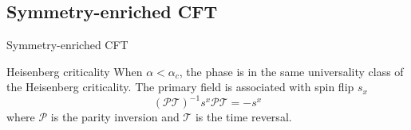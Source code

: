 \subsection{Symmetry-enriched CFT}
\begin{frame}{Symmetry-enriched CFT}

\begin{block}{Heisenberg criticality}
    When $\alpha < \alpha_c$, the phase is in the same universality class of the Heisenberg criticality.
    The primary field is associated with spin flip $s_x$
    \begin{equation*}
    (\mathcal{PT})^{-1} s^x \mathcal{PT} = -s^x
    \end{equation*}
    where $\mathcal{P}$ is the parity inversion and $\mathcal{T}$ is the time reversal.
\end{block}

\end{frame}
